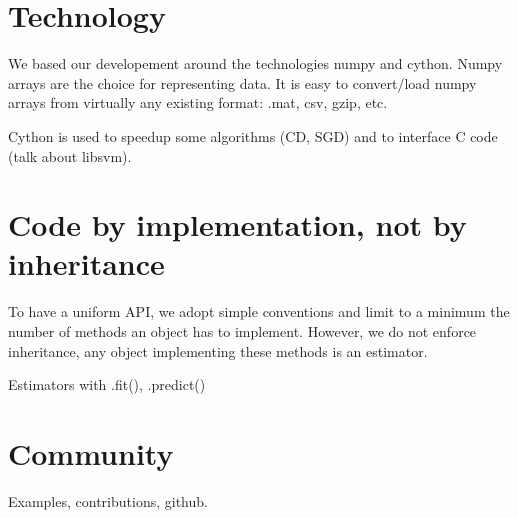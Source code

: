 \documentclass[twoside,11pt]{article}
\begin{document}
\section{Technology}

We based our developement around the technologies numpy and
cython. Numpy arrays are the choice for representing data. It is easy
to convert/load numpy arrays from virtually any existing format: .mat,
csv, gzip, etc.

Cython is used to speedup some algorithms (CD, SGD) and to interface C
code (talk about libsvm).

\section{Code by implementation, not by inheritance}

To have a uniform API, we adopt simple conventions and limit to a
minimum the number of methods an object has to implement. However, we
do not enforce inheritance, any object implementing these methods is
an estimator.


Estimators with .fit(), .predict()


\section{Community}

Examples, contributions, github.
\end{document}
